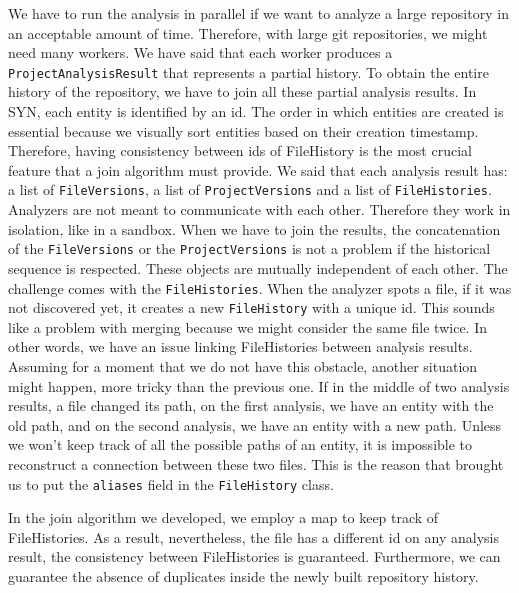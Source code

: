 We have to run the analysis in parallel if we want to analyze a large repository in an acceptable amount of time. Therefore, with large git repositories, we might need many workers. We have said that each worker produces a \texttt{ProjectAnalysisResult} that represents a partial history. To obtain the entire history of the repository, we have to join all these partial analysis results. 
In SYN, each entity is identified by an id. 
The order in which entities are created is essential because we visually sort entities based on their creation timestamp. 
Therefore, having consistency between ids of FileHistory is the most crucial feature that a join algorithm must provide.
We said that each analysis result has: a list of \texttt{FileVersions}, a list of \texttt{ProjectVersions} and a list of \texttt{FileHistories}. 
Analyzers are not meant to communicate with each other. Therefore they work in isolation, like in a sandbox. 
When we have to join the results, the concatenation of the \texttt{FileVersions} or the \texttt{ProjectVersions} is not a problem if the historical sequence is respected. 
These objects are mutually independent of each other.
The challenge comes with the \texttt{FileHistories}. When the analyzer spots a file, if it was not discovered yet, it creates a new \texttt{FileHistory} with a unique id. 
This sounds like a problem with merging because we might consider the same file twice. In other words, we have an issue linking FileHistories between analysis results.
Assuming for a moment that we do not have this obstacle, another situation might happen, more tricky than the previous one. 
If in the middle of two analysis results, a file changed its path, on the first analysis, we have an entity with the old path, 
and on the second analysis, we have an entity with a new path. 
Unless we won't keep track of all the possible paths of an entity, it is impossible to reconstruct a connection between these two files. 
This is the reason that brought us to put the \texttt{aliases} field in the \texttt{FileHistory} class. 

In the join algorithm we developed, we employ a map to keep track of FileHistories.
As a result, nevertheless, the file has a different id on any analysis result, the consistency between
FileHistories is guaranteed. Furthermore, we can guarantee the absence of duplicates inside the newly built repository history. 

